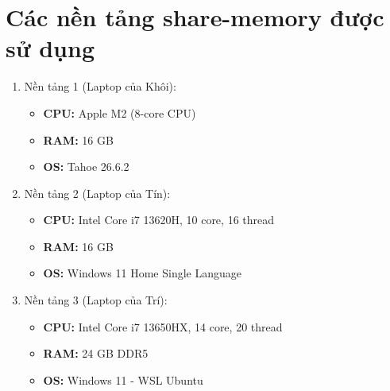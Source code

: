 \section{Các nền tảng share-memory được sử dụng}
\label{shared-mem}

\begin{enumerate}
    \item Nền tảng 1 (Laptop của Khôi):
          \begin{itemize}
              \item \textbf{CPU:}  Apple M2 (8-core CPU)
              \item \textbf{RAM:} 16 GB
              \item \textbf{OS:} Tahoe 26.6.2
          \end{itemize}
    \item Nền tảng 2 (Laptop của Tín):
          \begin{itemize}
              \item \textbf{CPU:} Intel Core i7 13620H, 10 core, 16 thread
              \item \textbf{RAM:} 16 GB
              \item \textbf{OS:} Windows 11 Home Single Language
          \end{itemize}
    \item Nền tảng 3 (Laptop của Trí):
          \begin{itemize}
              \item \textbf{CPU:} Intel Core i7 13650HX, 14 core, 20 thread
              \item \textbf{RAM:} 24 GB DDR5
              \item \textbf{OS:} Windows 11 - WSL Ubuntu
          \end{itemize}
\end{enumerate}